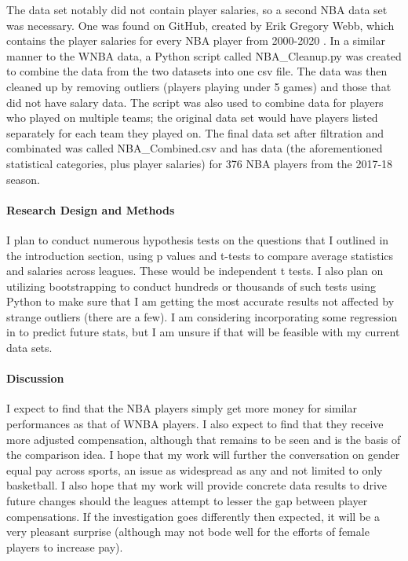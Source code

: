 \documentclass[12pt]{article}
\begin{document}
\newline
\par
The data set notably did not contain player salaries, so a second NBA data set was necessary. One was found on GitHub, created by Erik Gregory Webb, which contains the player salaries for every NBA player from 2000-2020 \cite{nba_salaries}. In a similar manner to the WNBA data, a Python script called NBA\_Cleanup.py was created to combine the data from the two datasets into one csv file. The data was then cleaned up by removing outliers (players playing under 5 games) and those that did not have salary data. The script was also used to combine data for players who played on multiple teams; the original data set would have players listed separately for each team they played on. The final data set after filtration and combinated was called NBA\_Combined.csv and has data (the aforementioned statistical categories, plus player salaries) for 376 NBA players from the 2017-18 season.


\paragraph{Research Design and Methods}
I plan to conduct numerous hypothesis tests on the questions that I outlined in the introduction 
section, using p values and t-tests to compare average statistics and salaries across leagues. 
These would be independent t tests. I also plan on utilizing bootstrapping to conduct hundreds 
or thousands of such tests using Python to make sure that I am getting the most accurate results 
not affected by strange outliers (there are a few). I am considering incorporating some regression 
in to predict future stats, but I am unsure if that will be feasible with my current data sets.

\paragraph{Discussion}
I expect to find that the NBA players simply get more money for similar performances as that of WNBA 
players. I also expect to find that they receive more adjusted compensation, although that remains to 
be seen and is the basis of the comparison idea. I hope that my work will further the conversation on 
gender equal pay across sports, an issue as widespread as any and not limited to only basketball. 
I also hope that my work will provide concrete data results to drive future changes should the leagues 
attempt to lesser the gap between player compensations. If the investigation goes differently then 
expected, it will be a very pleasant surprise (although may not bode well for the efforts of female 
players to increase pay).
\end{document}

